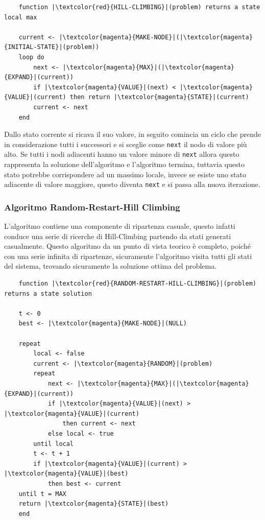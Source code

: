 \documentclass{article}
\numberwithin{equation}{subsection}
\begin{document}
\begin{verbatim}
    function |\textcolor{red}{HILL-CLIMBING}|(problem) returns a state local max

    current <- |\textcolor{magenta}{MAKE-NODE}|(|\textcolor{magenta}{INITIAL-STATE}|(problem))
    loop do 
        next <- |\textcolor{magenta}{MAX}|(|\textcolor{magenta}{EXPAND}|(current))
        if |\textcolor{magenta}{VALUE}|(next) < |\textcolor{magenta}{VALUE}|(current) then return |\textcolor{magenta}{STATE}|(current)
        current <- next
    end
\end{verbatim}

Dallo stato corrente si ricava il suo valore, in seguito comincia un ciclo che prende in considerazione tutti i successori e si sceglie come \verb|next| il nodo di 
valore più alto. Se tutti i nodi adiacenti hanno un valore minore di \verb|next| allora questo rappresenta la soluzione dell'algoritmo e l'algoritmo termina, tuttavia 
questo stato potrebbe corrispondere ad un massimo locale, invece se esiste uno stato adiacente di valore maggiore, questo diventa \verb|next| e si passa alla nuova 
iterazione. 

\subsubsection{Algoritmo Random-Restart-Hill Climbing}

L'algoritmo contiene una componente di ripartenza casuale, questo infatti conduce una serie di ricerche di Hill-Climbing partendo da stati generati casualmente. Questo 
algoritmo da un punto di vista teorico è completo, poiché con una serie infinita di ripartenze, sicuramente l'algoritmo visita tutti gli stati del sistema, trovando sicuramente 
la soluzione ottima del problema. 

\begin{verbatim}
    function |\textcolor{red}{RANDOM-RESTART-HILL-CLIMBING}|(problem) returns a state solution

    t <- 0
    best <- |\textcolor{magenta}{MAKE-NODE}|(NULL)

    repeat
        local <- false
        current <- |\textcolor{magenta}{RANDOM}|(problem)
        repeat 
            next <- |\textcolor{magenta}{MAX}|(|\textcolor{magenta}{EXPAND}|(current))
            if |\textcolor{magenta}{VALUE}|(next) > |\textcolor{magenta}{VALUE}|(current)
                then current <- next
            else local <- true
        until local
        t <- t + 1
        if |\textcolor{magenta}{VALUE}|(current) > |\textcolor{magenta}{VALUE}|(best)   
            then best <- current
    until t = MAX
    return |\textcolor{magenta}{STATE}|(best)
    end
\end{verbatim}
\end{document}

